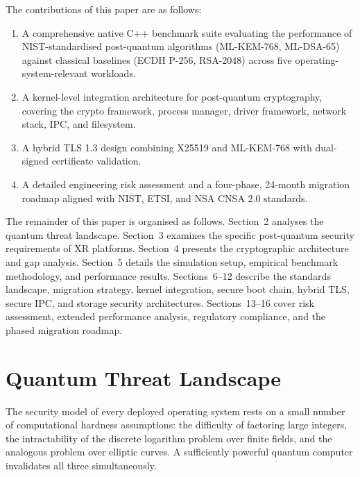 \documentclass[11pt, a4paper]{article}
\begin{document}
The contributions of this paper are as follows:

\begin{enumerate}
    \item A comprehensive native C++ benchmark suite evaluating the performance of NIST-standardised post-quantum algorithms (ML-KEM-768, ML-DSA-65) against classical baselines (ECDH P-256, RSA-2048) across five operating-system-relevant workloads.
    \item A kernel-level integration architecture for post-quantum cryptography, covering the crypto framework, process manager, driver framework, network stack, IPC, and filesystem.
    \item A hybrid TLS 1.3 design combining X25519 and ML-KEM-768 with dual-signed certificate validation.
    \item A detailed engineering risk assessment and a four-phase, 24-month migration roadmap aligned with NIST, ETSI, and NSA CNSA 2.0 standards.
\end{enumerate}

The remainder of this paper is organised as follows. Section~2 analyses the quantum threat landscape. Section~3 examines the specific post-quantum security requirements of XR platforms. Section~4 presents the cryptographic architecture and gap analysis. Section~5 details the simulation setup, empirical benchmark methodology, and performance results. Sections~6--12 describe the standards landscape, migration strategy, kernel integration, secure boot chain, hybrid TLS, secure IPC, and storage security architectures. Sections~13--16 cover risk assessment, extended performance analysis, regulatory compliance, and the phased migration roadmap.








\section{Quantum Threat Landscape}\label{sec:quantum-threat}

The security model of every deployed operating system rests on a small number of computational hardness assumptions: the difficulty of factoring large integers, the intractability of the discrete logarithm problem over finite fields, and the analogous problem over elliptic curves. A sufficiently powerful quantum computer invalidates all three simultaneously.
\end{document}
